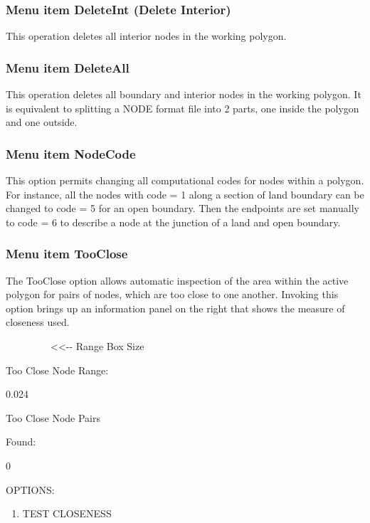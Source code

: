 \documentclass{article}
\begin{document}
\subsubsection[Menu item DeleteInt (Delete Interior)]{Menu item DeleteInt (Delete Interior)}
This operation deletes all interior nodes in the working polygon.

\subsubsection[Menu item DeleteAll]{Menu item DeleteAll}
This operation deletes all boundary and interior nodes in the working polygon. It is equivalent to splitting a NODE format file into 2 parts, one inside the polygon and one outside.

\subsubsection[Menu item NodeCode]{Menu item NodeCode}
This option permits changing all computational codes for nodes within a polygon. For instance, all the nodes with code = 1 along a section of land boundary can be changed to code = 5 for an open boundary. Then the endpoints are set manually to code = 6 to describe a node at the junction of a land and open boundary.

\subsubsection[Menu item TooClose]{Menu item TooClose}
The TooClose option allows automatic inspection of the area within the active polygon for pairs of nodes, which are too close to one another. Invoking this option brings up an information panel on the right that shows the measure of closeness used. 

\ \ \ \ \ \ \ \ \ {\textless}{\textless}-{}- Range Box Size

Too Close Node Range:

0.024

Too Close Node Pairs

Found:

0

OPTIONS:

\begin{enumerate}
\item TEST CLOSENESS
\end{enumerate}

\bigskip
\end{document}
